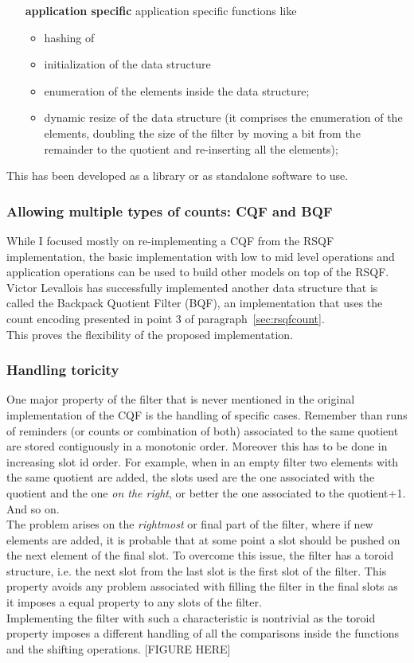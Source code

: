 \begin{itemize}
\begin{itemize}
	\end{itemize}
	\item[\textbf{application specific}] application specific functions like
	\begin{itemize}
		\item hashing of \kmers
		\item initialization of the data structure
		\item enumeration of the elements inside the data structure;
		\item dynamic resize of the data structure (it comprises the enumeration of the elements, doubling the size of the filter by moving a bit from the remainder to the quotient and re-inserting all the elements);
	\end{itemize} 
\end{itemize}
This has been developed as a library or as standalone software to use.
\subsubsection{Allowing multiple types of counts: CQF and BQF}
While I focused mostly on re-implementing a CQF from the RSQF implementation, the basic implementation with low to mid level operations and application operations can be used to build other models on top of the RSQF. Victor Levallois has successfully implemented another data structure that is called the Backpack Quotient Filter (BQF), an implementation that uses the count encoding presented in point 3 of paragraph~\ref{sec:rsqfcount}.\\
This proves the flexibility of the proposed implementation.
\subsubsection{Handling toricity}
One major property of the filter that is never mentioned in the original implementation of the CQF is the handling of specific cases. Remember than runs of reminders (or counts or combination of both) associated to the same quotient are stored contiguously in a monotonic order. Moreover this has to be done in increasing slot id order. For example, when in an empty filter two elements with the same quotient are added, the slots used are the one associated with the quotient and the one \emph{on the right}, or better the one associated to the quotient+1. And so on.\\
The problem arises on the \emph{rightmost} or final part of the filter, where if new elements are added, it is probable that at some point a slot should be pushed on the next element of the final slot. To overcome this issue, the filter has a toroid structure, i.e. the next slot from the last slot is the first slot of the filter. This property avoids any problem associated with filling the filter in the final slots as it imposes a equal property to any slots of the filter.\\
Implementing the filter with such a characteristic is nontrivial as the toroid property imposes a different handling of all the comparisons inside the functions and the shifting operations.
[FIGURE HERE] 

